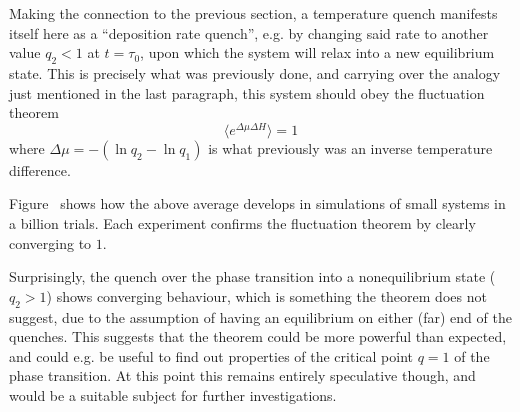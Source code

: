 Making the connection to the previous section, a temperature quench manifests itself here as a ``deposition rate quench'', e.g. by changing said rate to another value \(q_2 < 1\) at \(t = \tau_0\), upon which the system will relax into a new equilibrium state. This is precisely what was previously done, and carrying over the analogy just mentioned in the last paragraph, this system should obey the fluctuation theorem
%
\begin{equation}
	\langle e^{\Delta\mu\Delta H}\rangle = 1
\end{equation}
%
where \(\Delta\mu = -(\ln q_2-\ln q_1)\) is what previously was an inverse temperature difference.

Figure~ shows how the above average develops in simulations of small systems in a billion trials. Each experiment confirms the fluctuation theorem by clearly converging to \(1\).

Surprisingly, the quench over the phase transition into a nonequilibrium state (\(q_2 > 1\)) shows converging behaviour, which is something the theorem does not suggest, due to the assumption of having an equilibrium on either (far) end of the quenches. This suggests that the theorem could be more powerful than expected, and could e.g. be useful to find out properties of the critical point \(q = 1\) of the phase transition. At this point this remains entirely speculative though, and would be a suitable subject for further investigations.




